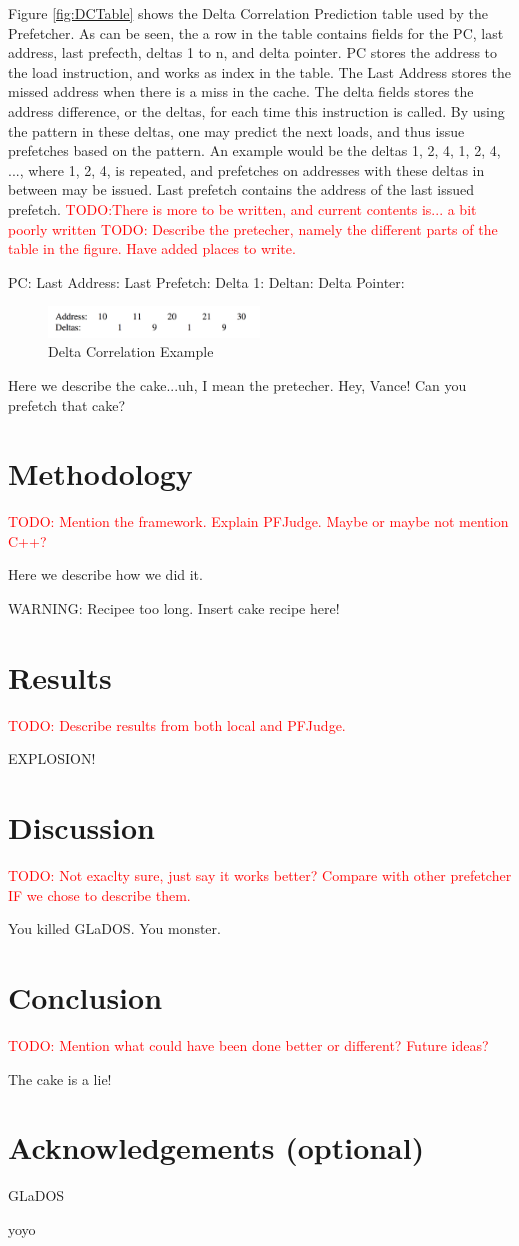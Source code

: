 \documentclass[a4paper]{IEEEtran}
\newcommand\TODO[1]{\textcolor{red}{TODO:#1}}
\newcommand\todo[1]{\TODO{#1}}
\begin{document}
\break
Figure \ref{fig:DCTable} shows the Delta Correlation Prediction table used by the Prefetcher. As can be seen, the a row in the table contains fields for the PC, last address, last prefecth, deltas 1 to n, and delta pointer. PC stores the address to the load instruction, and works as index in the table. The Last Address stores the missed address when there is a miss in the cache. The delta fields stores the address difference, or the deltas, for each time this instruction is called. By using the pattern in these deltas, one may predict the next loads, and thus issue prefetches based on the pattern. An example would be the deltas 1, 2, 4, 1, 2, 4, ..., where 1, 2, 4, is repeated, and prefetches on addresses with these deltas in between may be issued. 
\break Last prefetch contains the address of the last issued prefetch.
\todo{There is more to be written, and current contents is... a bit poorly written}
\break 
\todo{ Describe the pretecher, namely the different parts of the table in the figure. Have added places to write.}
\break

PC:
\break
Last Address:
\break
Last Prefetch:
\break
Delta 1:
\break
Deltan:
\break
Delta Pointer:

\begin{figure}[h!]
  \centering
      \includegraphics[width=0.5\textwidth]{Figures/DCExample}
  \caption{Delta Correlation Example}
  \label{fig:DCExample}
\end{figure}


Here we describe the cake...uh, I mean the pretecher. Hey, Vance! Can you prefetch that cake?
\section{Methodology}
\todo{ Mention the framework. Explain PFJudge. Maybe or maybe not mention C++?}
\break

Here we describe how we did it.

WARNING: Recipee too long. Insert cake recipe here!
\section{Results}
\todo{ Describe results from both local and PFJudge.}
\break

EXPLOSION!
\section{Discussion}
\todo{ Not exaclty sure, just say it works better? Compare with other prefetcher IF we chose to describe them. }
\break


You killed GLaDOS.
You monster.
\section{Conclusion}
\todo{ Mention what could have been done better or different? Future ideas? }
\break

The cake is a lie!
\section{Acknowledgements (optional)}
GLaDOS

yoyo \cite{assignment-text}



\nocite{*}
\end{document}
